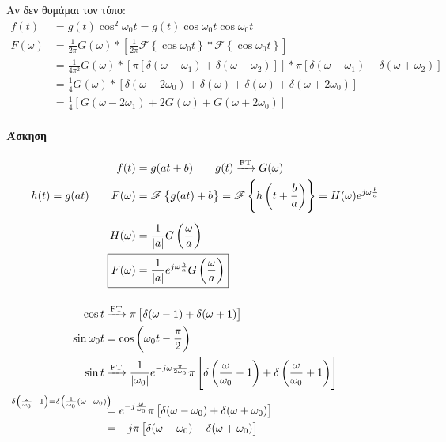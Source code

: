 \documentclass[11pt,a4paper,titlepage,fleqn]{article}
\begin{document}
     Αν δεν θυμάμαι τον τύπο:
     \begin{align*}
     f(t) &= g(t)\cos^2\omega_0 t = g(t)\cos\omega_0 t\cos\omega_0 t \\
     F(\omega ) &= \frac{1}{2\pi}G(\omega)*\left[
     \frac{1}{2\pi}\mathscr F\left\lbrace \cos\omega_0t \right\rbrace
     *\mathscr F \left\lbrace \cos\omega_0 t \right\rbrace
     \right] \\ &= \frac{1}{4\pi^2} G(\omega ) * \left[
     \pi\left[ \delta(\omega -\omega_1)+\delta(\omega+\omega_2) \right]
     \right] * \pi\left[
     \delta(\omega-\omega_1)+\delta(\omega+\omega_2)
     \right] \\ &=
     \frac{1}{4}G(\omega ) * \left[
     \delta(\omega -2\omega_0)+\delta(\omega)+\delta(\omega)+\delta(\omega+2\omega_0)
     \right]
     \\ &= \frac{1}{4}\left[
     G(\omega -2\omega_1)+2G(\omega )+G(\omega +2\omega_0)
     \right]
     \end{align*}
     
     \paragraph{Άσκηση}
     \begin{align*}
     f(t) &= g(at+b) \qquad g(t)\xrightarrow{\text{FT}}G(\omega ) \\
     h(t)=g(at) \qquad
     F(\omega ) &= \mathscr F\left\lbrace g(at)+b \right\rbrace
     = \mathscr F \left\lbrace h\left(t+\frac{b}{a}\right) \right\rbrace
     = H(\omega )e^{j\omega \frac{b}{a}} \\[5pt]
     H(\omega ) &= \frac{1}{|a|}G\left(\frac{\omega}{a}\right) \\
     \Aboxed{F(\omega ) &=
     \frac{1}{|a|}e^{j\omega\frac{b}{a}}G\left(\frac{\omega}{a}\right)}
     \end{align*}
     
     \paragraph{}
     \begin{align*}
     \cos t &\xrightarrow{\text{FT}} \pi\left[
     \delta(\omega -1)+\delta(\omega +1)
     \right] \\
     \sin \omega_0 t &= \cos\left(\omega_0t-\frac{\pi}{2}\right)
     \\
     \sin t &\xrightarrow{\text{FT}}
     \frac{1}{|\omega_0|}e^{-j\omega\frac{\pi}{2\omega_0}}\pi
     \left[ \delta\left(\frac{\omega}{\omega_0}-1\right)
     +\delta\left(\frac{\omega}{\omega_0} + 1\right)
      \right]
      \\ &\overset{\mathllap{\delta\left(\frac{\omega}{\omega_0}-1\right)
      	= \delta\left(\frac{1}{\omega_0}(\omega-\omega_0)\right)}
      	}{=}
      	e^{-j\frac{\omega}{\omega_0}}\pi\left[
      	\delta(\omega-\omega_0)+\delta(\omega +\omega_0)
      	\right] \\ &= -j\pi\left[
      	\delta(\omega -\omega_0)-\delta(\omega+\omega_0)
      	\right]
     \end{align*}
     
\end{document}

